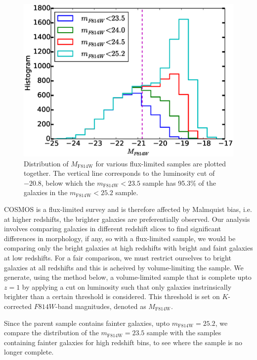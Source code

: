 \documentclass[twocolumn,useAMS,usenatbib]{mn2e}
\newcommand{\rachel}[1]{}
\newcommand{\arun}[1]{}
\begin{document}
\begin{figure}
  \centering
   \includegraphics[width=\columnwidth]{MAG_histograms}
   \caption{Distribution of $M_\text{F814W}$ for various flux-limited samples are plotted together. The vertical line corresponds to the luminosity cut of $-20.8$, below which the $m_\text{F814W}<23.5$ sample has 95.3\% of the galaxies in the $m_\text{F814W}<25.2$ sample.}
   \label{fig:2Dhist}
 \end{figure}
 
COSMOS is a flux-limited survey and is therefore affected by Malmquist bias, i.e. at higher redshifts, the brighter galaxies are preferentially observed.
Our analysis involves comparing galaxies in different redshift slices to find significant differences in morphology, if any, so with a flux-limited sample, we would be comparing only the bright galaxies at high redshifts with
bright and faint galaxies at low redshifts. For a fair comparison, we must restrict ourselves to bright galaxies at all redshifts and this is acheived by volume-limiting the sample.
We generate, using the method below, a volume-limited sample that is complete upto $z=1$ by applying a cut on luminosity such that only galaxies instrinsically brighter than a certain threshold is considered. This threshold is set on $K$-corrected $F814W$-band magnitudes, denoted as $M_\text{F814W}$.
\rachel{Is it $i$ band, or $I$ band?  Check which one and then be
  self-consistent throughout the text.}\arun{I think they call it
  $I_{814}$, so $I$.}
\rachel{But you are still being ambiguous in sometimes calling it $I$
  and other times F814W.  Pick one.}
Since the parent sample contains fainter galaxies, upto $m_\text{F814W}=25.2$, we compare the distribution of the $m_\text{F814W}=23.5$ sample with the samples containing fainter galaxies for high redshift bins, to see where the sample is no longer complete.
\end{document}
